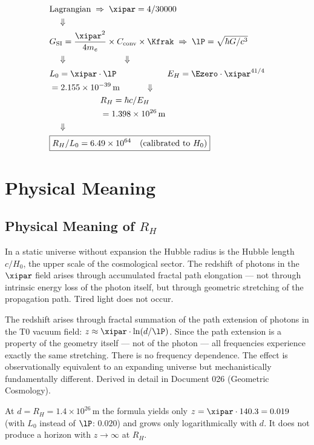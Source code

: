\begin{keyresult}
\begin{align}
	&\text{Lagrangian} \;\Rightarrow\; \xipar = 4/30000 \notag \\
	&\quad\Downarrow \notag \\
	&G_{\text{SI}} = \frac{\xipar^2}{4m_e} \times C_{\text{conv}} \times \Kfrak \;\Rightarrow\; \lP = \sqrt{\hbar G/c^3} \notag \\
	&\quad\Downarrow\qquad\qquad\qquad\quad\Downarrow \notag \\
	&L_0 = \xipar \cdot \lP \qquad\qquad\qquad E_H = \Ezero \cdot \xipar^{41/4} \notag \\
	&= 2{.}155 \times 10^{-39}\,\text{m} \qquad\quad\Downarrow \notag \\
	&\qquad\qquad\qquad R_H = \hbar c/E_H \notag \\
	&\qquad\qquad\qquad = 1{.}398 \times 10^{26}\,\text{m} \notag \\
	&\quad\Downarrow \notag \\
	&\boxed{R_H/L_0 = 6{.}49 \times 10^{64} \quad \text{(calibrated to } H_0 \text{)}}
\end{align}
\end{keyresult}

\section{Physical Meaning}

\subsection{Physical Meaning of \texorpdfstring{$R_H$}{R\_H}}

In a static universe without expansion the Hubble radius is the Hubble length $c/H_0$, the upper scale of the cosmological sector. The redshift of photons in the $\xipar$ field arises through accumulated fractal path elongation — not through intrinsic energy loss of the photon itself, but through geometric stretching of the propagation path. Tired light does not occur.

\begin{keypoint}
The redshift arises through fractal summation of the path extension of photons in the T0 vacuum field: $z \approx \xipar \cdot \ln(d/\lP)$. Since the path extension is a property of the geometry itself — not of the photon — all frequencies experience exactly the same stretching. There is no frequency dependence. The effect is observationally equivalent to an expanding universe but mechanistically fundamentally different. Derived in detail in Document 026 (Geometric Cosmology).

At $d = R_H = 1.4\times 10^{26}$\,m the formula yields only $z = \xipar \cdot 140.3 = 0.019$ (with $L_0$ instead of $\lP$: $0.020$) and grows only logarithmically with $d$. It does not produce a horizon with $z \to \infty$ at $R_H$.
\end{keypoint}

